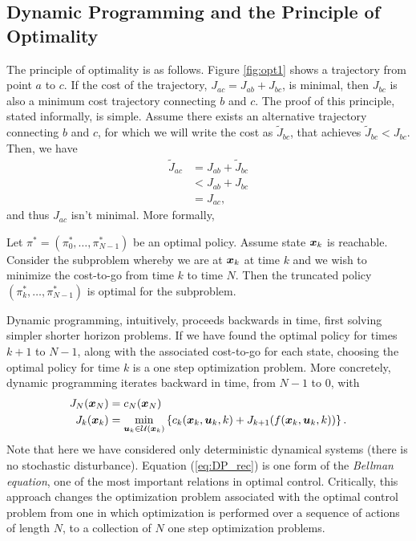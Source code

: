 \subsection{Dynamic Programming and the Principle of Optimality}

The principle of optimality is as follows. Figure \ref{fig:opt1} shows a trajectory from point $a$ to $c$. If the cost of the trajectory, $J_{ac} = J_{ab} + J_{bc}$, is minimal, then $J_{bc}$ is also a minimum cost trajectory connecting $b$ and $c$. The proof of this principle, stated informally, is simple. Assume there exists an alternative trajectory connecting $b$ and $c$, for which we will write the cost as $\tilde{J}_{bc}$, that achieves $\tilde{J}_{bc} < J_{bc}$. Then, we have 
\begin{align}
    \tilde{J}_{ac} &= J_{ab} + \tilde{J}_{bc}\\
    &< J_{ab} + J_{bc}\\
    &= J_{ac},
\end{align}
and thus $J_{ac}$ isn't minimal. More formally,

\begin{theorem}
Let $\pi^* = (\pi_0^*, \ldots, \pi^*_{N-1})$ be an optimal policy. Assume state $\bm{x}_k$ is reachable. Consider the subproblem whereby we are at $\bm{x}_k$ at time $k$ and we wish to minimize the cost-to-go from time $k$ to time $N$. Then the truncated policy $(\pi_k^*, \ldots, \pi^*_{N-1})$ is optimal for the subproblem.
\end{theorem}

Dynamic programming, intuitively, proceeds backwards in time, first solving simpler shorter horizon problems. If we have found the optimal policy for times $k+1$ to $N-1$, along with the associated cost-to-go for each state, choosing the optimal policy for time $k$ is a one step optimization problem. More concretely, dynamic programming iterates backward in time, from $N-1$ to $0$, with
\begin{align}
    J_N(\bm{x}_N) &= c_N(\bm{x}_N)\\
    J_k(\bm{x}_k) &= \min_{\bm{u}_k \in \mathcal{U}(\bm{x}_k)} \left\{ c_k(\bm{x}_k,\bm{u}_k,k) + J_{k+1}(f(\bm{x}_k,\bm{u}_k,k)) \right\}.
    \label{eq:DP_rec}
\end{align}
Note that here we have considered only deterministic dynamical systems (there is no stochastic disturbance). Equation (\ref{eq:DP_rec}) is one form of the \textit{Bellman equation}, one of the most important relations in optimal control. Critically, this approach changes the optimization problem associated with the optimal control problem from one in which optimization is performed over a sequence of actions of length $N$, to a collection of $N$ one step optimization problems. 

